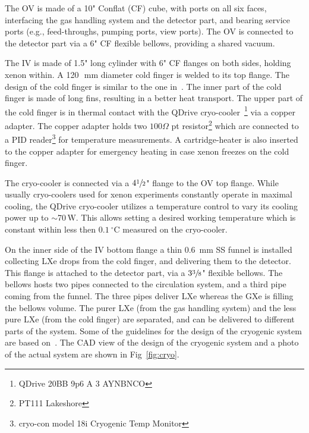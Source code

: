 The OV is made of a 10" Conflat (CF) cube, with ports on all six faces, interfacing the gas handling system and  the detector part, and bearing service ports (e.g., feed-throughs, pumping ports, 
view ports). The OV is connected to the detector part via a 6" CF flexible bellows, providing a shared vacuum.

The IV is made of 1.5" long cylinder with 6" CF flanges on both sides, holding xenon within. A 120~\,mm diameter cold finger is welded to its top flange. The design of the cold finger is similar to the one in~\cite{xe100_instr2012}. The inner part of the cold finger is made of long fins, resulting in a better heat transport.  The upper part of the cold finger is in thermal contact with the 
QDrive cryo-cooler~\footnote{QDrive 20BB 9p6 A 3 AYNBNCO} via a copper adapter. The copper adapter 
holds two $100\Omega$ pt resistor\footnote{PT111 Lakeshore} which are connected to a PID reader\footnote{cryo-con model 
18i Cryogenic Temp Monitor} for temperature measurements. A cartridge-heater 
is also inserted to the copper adapter for emergency heating in case xenon freezes on the 
cold finger. 

The cryo-cooler is connected via a $4\sfrac{1}{2}$" 
flange to the OV top flange. While usually cryo-coolers used for 
xenon experiments constantly operate in maximal cooling, the QDrive cryo-cooler utilizes a 
temperature control to vary its cooling power up to $\sim$70\,W. This allows setting a desired working temperature which is constant within less then $0.1~\mathrm{^{\circ}C}$ measured on the cryo-cooler.

On the inner side of the IV bottom flange a thin 0.6~mm SS funnel is installed 
collecting LXe drops from the cold finger, and delivering them to the  detector. This flange is attached to the detector part, via a $3\sfrac{3}{8}$" flexible bellows. The 
bellows hosts two pipes connected to the circulation system, and a third pipe coming 
from the funnel. The three pipes deliver LXe whereas the GXe is filling the bellows volume. The purer LXe (from the gas handling system) and the less pure LXe (from the cold finger) are separated, and can be delivered to different parts of the system. Some of the guidelines for the design of 
the cryogenic system are based on~\cite{Giboni:2014hia}. The CAD view of 
the design of the cryogenic system and a photo of the actual system are shown in Fig~\ref{fig:cryo}. 

